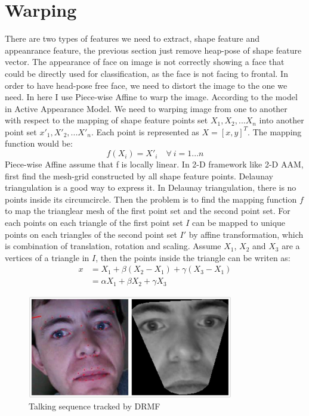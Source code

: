 \section{Warping}
There are two types of features we need to extract, shape feature and appeanrance feature, the previous section just remove heap-pose of shape feature vector. The appearance of face on image is not correctly showing a face that could be directly used for classification, as the face is not facing to frontal. In order to have head-pose free face, we need to distort the image to the one we need. In here I use Piece-wise Affine to warp the image. According to the model in Active Appearance Model. We need to warping image from one to another with respect to the mapping of shape feature points set ${X_{1},X_{2},...X_{n}}$ into another point set ${x'_{1},X'_{2},...X'_{n}}$. Each point is represented as $X = [x,y]^{T}$. The mapping function would be:
\begin{equation}
f(X_{i}) = X'_{i} \quad \forall \ i = 1...n
\label{eq:W1}
\end{equation}
\newline
Piece-wise Affine assume that f is locally linear. In 2-D framework like 2-D AAM, first find the mesh-grid constructed by all shape feature points. Delaunay triangulation is a good way to express it. In Delaunay triangulation, there is no points inside its circumcircle. Then the problem is to find the mapping function $f$ to map the trianglear mesh of the first point set and the second point set. For each points on each triangle of the first point set $I$ can be mapped to unique points on each triangles of the second point set $I'$ by affine transformation, which is combination of translation, rotation and scaling. Assume $X_{1}$, $X_{2}$ and $X_{3}$ are a vertices of a triangle in $I$, then the points inside the triangle can be writen as:
\begin{align*}
x 
& = X_{1} + \beta (X_{2}-X_{1})+\gamma (X_{3}-X_{1}) \\
&  = \alpha X_{1} + \beta X_{2} + \gamma X_{3}
\end{align*}
\begin{figure}[ht]
\centering
\includegraphics[width=90mm]{imgs/Warping_Intraface_213.png}
\caption{Talking sequence tracked by DRMF}
\end{figure}
\newpage
